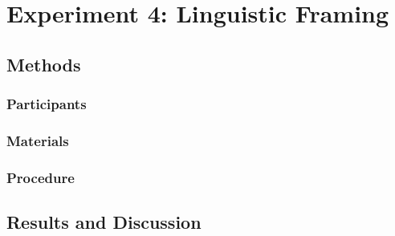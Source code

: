 \documentclass[man,noapacite]{apa2}
\begin{document}
\section{Experiment 4: Linguistic Framing}

\subsection{Methods}

\subsubsection{Participants}
\subsubsection{Materials}
\subsubsection{Procedure}

\subsection{Results and Discussion}

\newpage



\end{document}
